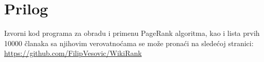 \documentclass[12pt, journal, compsoc]{IEEEtran}
\begin{document}
\section*{Prilog}
Izvorni kod programa za obradu i primenu PageRank algoritma, kao i lista prvih 10000 članaka sa njihovim verovatnoćama se može pronaći na sledećoj stranici:\\ \href{https://github.com/FilipVesovic/WikiRank}{https://github.com/FilipVesovic/WikiRank} 

%







\ifCLASSOPTIONcaptionsoff
  \newpage
\fi
\end{document}
